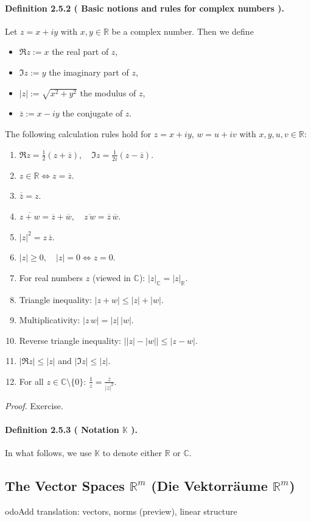\documentclass[12pt,a4paper]{article}
\newcommand{\R}{\mathbb{R}}
\newcommand{\C}{\mathbb{C}}
\newcommand{\K}{\mathbb{K}} %
\newcommand{\NumberedDefinition}[3]{%
	\paragraph{Definition #1 ( #2 ).} #3\par
}
\theoremstyle{plain}
\theoremstyle{definition}
\theoremstyle{remark}
\begin{document}
\NumberedDefinition{2.5.2}{Basic notions and rules for complex numbers}{
Let $z=x+iy$ with $x,y\in\R$ be a complex number. Then we define
\begin{itemize}[leftmargin=*]
	\item $\Re z := x$ the real part of $z$,
	\item $\Im z := y$ the imaginary part of $z$,
	\item $|z| := \sqrt{x^2+y^2}$ the modulus of $z$,
	\item $\overline{z} := x - iy$ the conjugate of $z$.
\end{itemize}
The following calculation rules hold for
$z=x+iy$, $w=u+iv$ with $x,y,u,v\in\R$:
\begin{enumerate}[label={(\arabic*)}, leftmargin=*]
	\item $\Re z = \tfrac12(z+\overline{z}),\quad \Im z = \tfrac{1}{2i}(z-\overline{z})$.
	\item $z\in\R \iff z=\overline{z}$.
	\item $\overline{\overline{z}}=z$.
	\item $\overline{z+w}=\overline{z}+\overline{w},\quad \overline{z\,w}=\overline{z}\,\overline{w}$.
	\item $|z|^2 = z\,\overline{z}$.
	\item $|z|\ge 0,\quad |z|=0 \iff z=0$.
	\item For real numbers $z$ (viewed in $\C$): $|z|_{\C}=|z|_{\R}$.
	\item Triangle inequality: $|z+w|\le |z|+|w|$.
	\item Multiplicativity: $|z\,w|=|z|\,|w|$.
	\item Reverse triangle inequality: $\big||z|-|w|\big| \le |z-w|$.
	\item $|\Re z|\le |z|$ and $|\Im z|\le |z|$.
	\item For all $z\in\C\setminus\{0\}$: $\displaystyle \frac{1}{z}=\frac{\overline{z}}{|z|^2}$.
\end{enumerate}
\emph{Proof.} Exercise.
}

\NumberedDefinition{2.5.3}{Notation $\K$}{In what follows, we use $\K$ to denote either $\R$ or $\C$.}
\subsection{The Vector Spaces $\R^m$ (Die Vektorräume $\R^m$)}
	odo{Add translation: vectors, norms (preview), linear structure}
\end{document}
